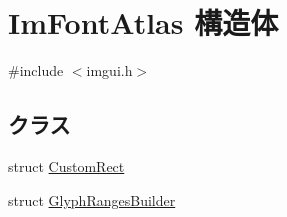 \hypertarget{struct_im_font_atlas}{}\section{Im\+Font\+Atlas 構造体}
\label{struct_im_font_atlas}


{\ttfamily \#include $<$imgui.\+h$>$}

\subsection*{クラス}
\begin{DoxyCompactItemize}
\item 
struct \mbox{\hyperlink{struct_im_font_atlas_1_1_custom_rect}{Custom\+Rect}}
\item 
struct \mbox{\hyperlink{struct_im_font_atlas_1_1_glyph_ranges_builder}{Glyph\+Ranges\+Builder}}
\end{DoxyCompactItemize}
